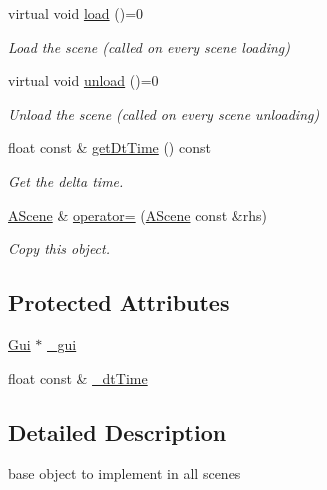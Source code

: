 \begin{DoxyCompactItemize}
\mbox{\label{class_a_scene_a8f6201c6a7ccefdebdc9ecf69d35a1d8}} 
virtual void \hyperlink{class_a_scene_a8f6201c6a7ccefdebdc9ecf69d35a1d8}{load} ()=0
\begin{DoxyCompactList}\small\item\em Load the scene (called on every scene loading) \end{DoxyCompactList}\item 
\mbox{\label{class_a_scene_aeb259110cc48bac42ea05bbe24b5d2a8}} 
virtual void \hyperlink{class_a_scene_aeb259110cc48bac42ea05bbe24b5d2a8}{unload} ()=0
\begin{DoxyCompactList}\small\item\em Unload the scene (called on every scene unloading) \end{DoxyCompactList}\item 
float const  \& \hyperlink{class_a_scene_aad3e0d8810515e904fc315a12a344bc3}{get\+Dt\+Time} () const
\begin{DoxyCompactList}\small\item\em Get the delta time. \end{DoxyCompactList}\item 
\hyperlink{class_a_scene}{A\+Scene} \& \hyperlink{class_a_scene_aedf714310c418b3972e2e9c96ac7bff1}{operator=} (\hyperlink{class_a_scene}{A\+Scene} const \&rhs)
\begin{DoxyCompactList}\small\item\em Copy this object. \end{DoxyCompactList}\end{DoxyCompactItemize}
\subsection*{Protected Attributes}
\begin{DoxyCompactItemize}
\item 
\hyperlink{class_gui}{Gui} $\ast$ \hyperlink{class_a_scene_afdf549ea35306aecfa7a7976a5594fe1}{\+\_\+gui}
\item 
float const  \& \hyperlink{class_a_scene_a8cbb61bc0c24add293a08d3cc83ac2ea}{\+\_\+dt\+Time}
\end{DoxyCompactItemize}


\subsection{Detailed Description}
base object to implement in all scenes 

